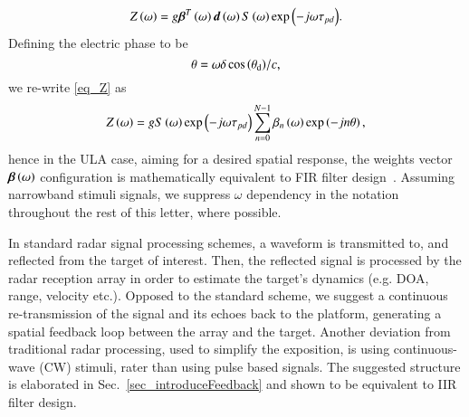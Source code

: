 \begin{equation}
    \label{eq_Z}
    Z\rBrace{\omega} = g\vecnot{\beta}^{T}\rBrace{\omega}\vecnot{d}\rBrace{\omega}\F{s}\rBrace{\omega}\exp{\rBrace{-j\omega\tau_{pd}}}.
\end{equation}
Defining the electric phase to be
\begin{equation}\label{eq:thetaULA}
\theta=\omega{\delta\cos\Brack{\thetaD}}/{c},
\end{equation}
we re-write \eqref{eq_Z} as 
\[
Z\rBrace{\omega} = g\F{s}\rBrace{\omega}\exp{\rBrace{-j\omega\tau_{pd}}}\sum_{n=0}^{N-1}\beta_{n}\rBrace{\omega}\exp\Brack{-jn\theta},
\]
hence in the ULA case, aiming for a desired spatial response, the weights vector $\boldsymbol{\beta}\left({\omega}\right)$ configuration is mathematically equivalent to FIR filter design~\cite{van1988beamforming}. 
\ifdefined\useOmega \else 
Assuming narrowband stimuli signals, we suppress $\omega$ dependency in the notation throughout the rest of this letter, where possible.
\fi
\par In standard radar signal processing schemes, a waveform is transmitted to, and reflected from the target of interest. Then, the reflected signal is processed by the radar reception array in order to estimate the target's dynamics (e.g. DOA, range, velocity etc.). 
Opposed to the standard scheme, we suggest a continuous re-transmission of the signal and its echoes back to the platform, generating a spatial feedback loop between the array and the target.
Another deviation from traditional radar processing, used to simplify the exposition, is using continuous-wave (CW) stimuli, rater than using pulse based signals. The suggested structure is elaborated in Sec.~\ref{sec_introduceFeedback} and shown to be equivalent to IIR filter design.